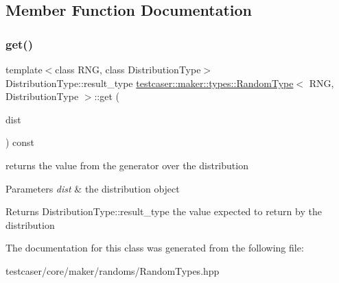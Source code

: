 \subsection{Member Function Documentation}
\mbox{\label{classtestcaser_1_1maker_1_1types_1_1RandomType_a48c855182f25804a9b8c55ec5bf9aba5}} 
\subsubsection{\texorpdfstring{get()}{get()}}
{\footnotesize\ttfamily template$<$class R\+NG, class Distribution\+Type$>$ \\
Distribution\+Type\+::result\+\_\+type \mbox{\hyperlink{classtestcaser_1_1maker_1_1types_1_1RandomType}{testcaser\+::maker\+::types\+::\+Random\+Type}}$<$ R\+NG, Distribution\+Type $>$\+::get (\begin{DoxyParamCaption}\item[{Distribution\+Type \&}]{dist }\end{DoxyParamCaption}) const\hspace{0.3cm}{\ttfamily [inline]}}



returns the value from the generator over the distribution 


\begin{DoxyParams}{Parameters}
{\em dist} & the distribution object \\
\hline
\end{DoxyParams}
\begin{DoxyReturn}{Returns}
Distribution\+Type\+::result\+\_\+type the value expected to return by the distribution 
\end{DoxyReturn}


The documentation for this class was generated from the following file\+:\begin{DoxyCompactItemize}
\item 
testcaser/core/maker/randoms/Random\+Types.\+hpp\end{DoxyCompactItemize}
